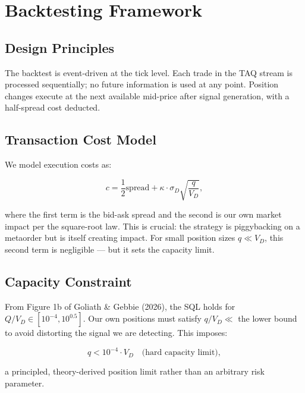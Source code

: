 \documentclass[12pt,a4paper]{article}
\begin{document}
\section{Backtesting Framework}
\label{sec:backtest}

\subsection{Design Principles}

The backtest is event-driven at the tick level. Each trade in the TAQ stream
is processed sequentially; no future information is used at any point. Position
changes execute at the next available mid-price after signal generation,
with a half-spread cost deducted.

\subsection{Transaction Cost Model}

We model execution costs as:

\begin{equation}
  c = \frac{1}{2}\text{spread} + \kappa \cdot \sigma_D \sqrt{\frac{q}{V_D}},
  \label{eq:costs}
\end{equation}

\noindent where the first term is the bid-ask spread and the second is our own
market impact per the square-root law. This is crucial: the strategy is
piggybacking on a metaorder but is itself creating impact. For small position
sizes $q \ll V_D$, this second term is negligible --- but it sets the capacity
limit.

\subsection{Capacity Constraint}

From Figure 1b of Goliath \& Gebbie (2026), the SQL holds for
$Q/V_D \in [10^{-4}, 10^{0.5}]$. Our own positions must satisfy $q/V_D \ll$
the lower bound to avoid distorting the signal we are detecting. This imposes:

\begin{equation}
  q < 10^{-4} \cdot V_D \quad \text{(hard capacity limit)},
  \label{eq:capacity}
\end{equation}

\noindent a principled, theory-derived position limit rather than an arbitrary
risk parameter.
\end{document}
